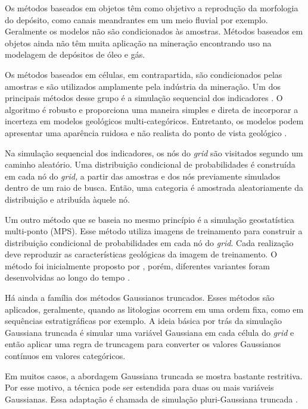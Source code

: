 Os métodos baseados em objetos \cite{pyrcz2014geostatistical} têm como objetivo a reprodução da morfologia do depósito, como canais meandrantes em um meio fluvial por exemplo. Geralmente os modelos não são condicionados às amostras. Métodos baseados em objetos ainda não têm muita aplicação na mineração encontrando uso na modelagem de depósitos de óleo e gás.

Os métodos baseados em células, em contrapartida, são condicionados pelas amostras e são utilizados amplamente pela indústria da mineração. Um dos principais métodos desse grupo é a simulação sequencial dos indicadores \cite{alabert1987stochastic}. O algoritmo é robusto e proporciona uma maneira simples e direta de incorporar a incerteza em modelos geológicos multi-categóricos. Entretanto, os modelos podem apresentar uma aparência ruidosa e não realista do ponto de vista geológico \cite{deutsch2006sequential}.

Na simulação sequencial dos indicadores, os nós do \textit{grid} são visitados segundo um caminho aleatório. Uma distribuição condicional de probabilidades é construída em cada nó do \textit{grid,} a partir das amostras e dos nós previamente simulados dentro de um raio de busca. Então, uma categoria é amostrada aleatoriamente da distribuição e atribuída àquele nó.  

Um outro método que se baseia no mesmo princípio é a simulação geostatística multi-ponto (MPS). Esse método utiliza imagens de treinamento para construir a distribuição condicional de probabilidades em cada nó do \textit{grid}. Cada realização deve reproduzir as características geológicas da imagem de treinamento. O método foi inicialmente proposto por , porém, diferentes variantes foram desenvolvidas ao longo do tempo \cite{strebelle, boucher2009considering}.

Há ainda a família dos métodos Gaussianos truncados. Esses métodos são aplicados, geralmente, quando as litologias ocorrem em uma ordem fixa, como em sequências estratigráficas por exemplo. A ideia básica por trás da simulação Gaussiana truncada \cite{matheron1987conditional} é simular uma variável Gaussiana em cada célula do \textit{grid} e então aplicar uma regra de truncagem para converter os valores Gaussianos contínuos em valores categóricos.

Em muitos casos, a abordagem Gaussiana truncada se mostra bastante restritiva. Por esse motivo, a técnica pode ser estendida para duas ou mais variáveis Gaussianas. Essa adaptação é chamada de simulação pluri-Gaussiana truncada \cite{armstrong2011plurigaussian}.

